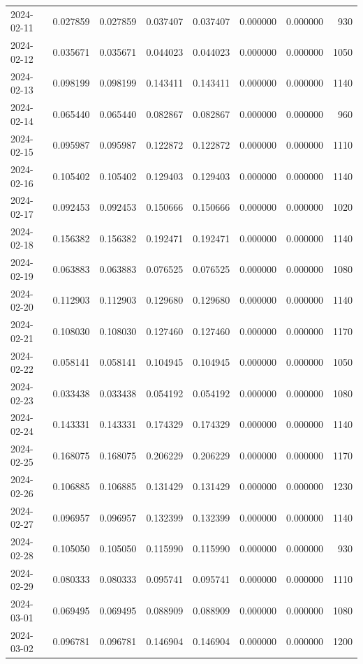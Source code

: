 \begin{tabular}{lrrrrrrr}
2024-02-11 & 0.027859 & 0.027859 & 0.037407 & 0.037407 & 0.000000 & 0.000000 & 930 \\
2024-02-12 & 0.035671 & 0.035671 & 0.044023 & 0.044023 & 0.000000 & 0.000000 & 1050 \\
2024-02-13 & 0.098199 & 0.098199 & 0.143411 & 0.143411 & 0.000000 & 0.000000 & 1140 \\
2024-02-14 & 0.065440 & 0.065440 & 0.082867 & 0.082867 & 0.000000 & 0.000000 & 960 \\
2024-02-15 & 0.095987 & 0.095987 & 0.122872 & 0.122872 & 0.000000 & 0.000000 & 1110 \\
2024-02-16 & 0.105402 & 0.105402 & 0.129403 & 0.129403 & 0.000000 & 0.000000 & 1140 \\
2024-02-17 & 0.092453 & 0.092453 & 0.150666 & 0.150666 & 0.000000 & 0.000000 & 1020 \\
2024-02-18 & 0.156382 & 0.156382 & 0.192471 & 0.192471 & 0.000000 & 0.000000 & 1140 \\
2024-02-19 & 0.063883 & 0.063883 & 0.076525 & 0.076525 & 0.000000 & 0.000000 & 1080 \\
2024-02-20 & 0.112903 & 0.112903 & 0.129680 & 0.129680 & 0.000000 & 0.000000 & 1140 \\
2024-02-21 & 0.108030 & 0.108030 & 0.127460 & 0.127460 & 0.000000 & 0.000000 & 1170 \\
2024-02-22 & 0.058141 & 0.058141 & 0.104945 & 0.104945 & 0.000000 & 0.000000 & 1050 \\
2024-02-23 & 0.033438 & 0.033438 & 0.054192 & 0.054192 & 0.000000 & 0.000000 & 1080 \\
2024-02-24 & 0.143331 & 0.143331 & 0.174329 & 0.174329 & 0.000000 & 0.000000 & 1140 \\
2024-02-25 & 0.168075 & 0.168075 & 0.206229 & 0.206229 & 0.000000 & 0.000000 & 1170 \\
2024-02-26 & 0.106885 & 0.106885 & 0.131429 & 0.131429 & 0.000000 & 0.000000 & 1230 \\
2024-02-27 & 0.096957 & 0.096957 & 0.132399 & 0.132399 & 0.000000 & 0.000000 & 1140 \\
2024-02-28 & 0.105050 & 0.105050 & 0.115990 & 0.115990 & 0.000000 & 0.000000 & 930 \\
2024-02-29 & 0.080333 & 0.080333 & 0.095741 & 0.095741 & 0.000000 & 0.000000 & 1110 \\
2024-03-01 & 0.069495 & 0.069495 & 0.088909 & 0.088909 & 0.000000 & 0.000000 & 1080 \\
2024-03-02 & 0.096781 & 0.096781 & 0.146904 & 0.146904 & 0.000000 & 0.000000 & 1200 \\

\end{tabular}
